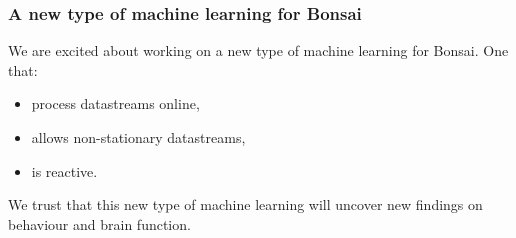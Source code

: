 \begin{frame}
    \frametitle{A new type of machine learning for Bonsai}

    We are excited about working on a new type of machine learning for Bonsai.
    One that:

    \begin{itemize}

        \item process datastreams online,

        \item allows non-stationary datastreams,

        \item is reactive.

    \end{itemize}

    We trust that this new type of machine learning will uncover new findings
    on behaviour and brain function.

\end{frame}
